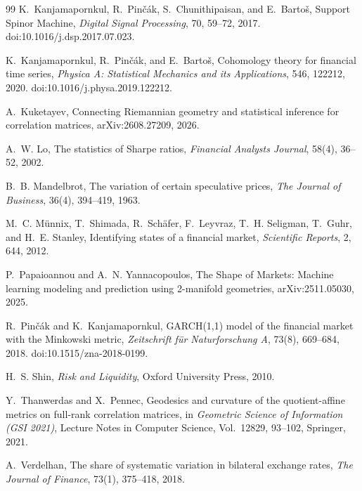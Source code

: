 \documentclass[11pt,a4paper]{article}
\numberwithin{equation}{section}
\begin{document}
\begin{thebibliography}{99}
K.~Kanjamapornkul, R.~Pinčák, S.~Chunithipaisan, and E.~Bartoš,
Support Spinor Machine,
\emph{Digital Signal Processing}, 70, 59--72, 2017.
doi:10.1016/j.dsp.2017.07.023.

K.~Kanjamapornkul, R.~Pinčák, and E.~Bartoš,
Cohomology theory for financial time series,
\emph{Physica A: Statistical Mechanics and its Applications},
546, 122212, 2020.
doi:10.1016/j.physa.2019.122212.

A.~Kuketayev,
Connecting Riemannian geometry and statistical inference for
correlation matrices,
arXiv:2608.27209, 2026.

A.~W. Lo,
The statistics of Sharpe ratios,
\emph{Financial Analysts Journal},
58(4), 36--52, 2002.

B.~B. Mandelbrot,
The variation of certain speculative prices,
\emph{The Journal of Business},
36(4), 394--419, 1963.

M.~C. Münnix, T.~Shimada, R.~Schäfer, F.~Leyvraz, T.~H. Seligman,
T.~Guhr, and H.~E. Stanley,
Identifying states of a financial market,
\emph{Scientific Reports},
2, 644, 2012.

P.~Papaioannou and A.~N. Yannacopoulos,
The Shape of Markets: Machine learning modeling and prediction
using 2-manifold geometries,
arXiv:2511.05030, 2025.

R.~Pinčák and K.~Kanjamapornkul,
GARCH(1,1) model of the financial market with the Minkowski metric,
\emph{Zeitschrift für Naturforschung A},
73(8), 669--684, 2018.
doi:10.1515/zna-2018-0199.

H.~S. Shin,
\emph{Risk and Liquidity},
Oxford University Press, 2010.

Y.~Thanwerdas and X.~Pennec,
Geodesics and curvature of the quotient-affine metrics on
full-rank correlation matrices,
in \emph{Geometric Science of Information (GSI 2021)},
Lecture Notes in Computer Science, Vol.~12829, 93--102, Springer,
2021.

A.~Verdelhan,
The share of systematic variation in bilateral exchange rates,
\emph{The Journal of Finance},
73(1), 375--418, 2018.

\end{thebibliography}
\end{document}
